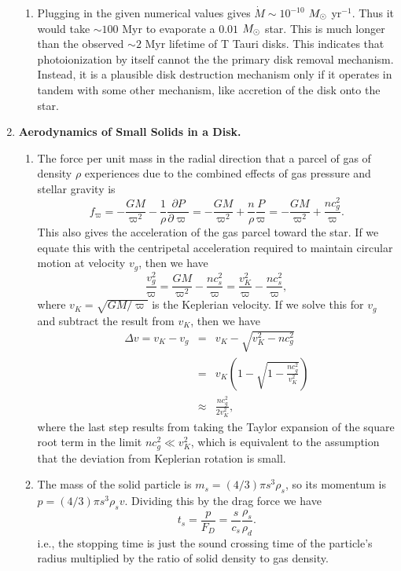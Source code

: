 \begin{enumerate}
\begin{enumerate}
\item Plugging in the given numerical values gives $\dot{M} \sim 10^{-10}$ $M_{\odot}$ yr$^{-1}$. Thus it would take $\sim 100$ Myr to evaporate a $0.01$ $M_{\odot}$ star. This is much longer than the observed $\sim 2$ Myr lifetime of T Tauri disks. This indicates that photoionization by itself cannot the the primary disk removal mechanism. Instead, it is a plausible disk destruction mechanism only if it operates in tandem with some other mechanism, like accretion of the disk onto the star.

\end{enumerate}

\item {\bf Aerodynamics of Small Solids in a Disk.}

\begin{enumerate}

\item The force per unit mass in the radial direction that a parcel of gas of density $\rho$ experiences due to the combined effects of gas pressure and stellar gravity is
\begin{displaymath}
f_\varpi = -\frac{G M}{\varpi^2} - \frac{1}{\rho}\frac{\partial P}{\partial \varpi} = -\frac{GM}{\varpi^2} + \frac{n}{\rho}\frac{P}{\varpi} = -\frac{GM}{\varpi^2} + \frac{n c_g^2}{\varpi}.
\end{displaymath}
This also gives the acceleration of the gas parcel toward the star. If we equate this with the centripetal acceleration required to maintain circular motion at velocity $v_g$, then we have
\begin{displaymath}
\frac{v_g^2}{\varpi} = \frac{GM}{\varpi^2} - \frac{n c_s^2}{\varpi} = \frac{v_K^2}{\varpi} - \frac{n c_s^2}{\varpi},
\end{displaymath}
where $v_K = \sqrt{GM/\varpi}$ is the Keplerian velocity. If we solve this for $v_g$ and subtract the result from $v_K$, then we have
\begin{eqnarray*}
\Delta v = v_K - v_g & = & v_K - \sqrt{v_K^2 - n c_g^2} \\
& = & v_K \left(1 - \sqrt{1 - \frac{n c_g^2}{v_K^2}}\right) \\
& \approx & \frac{n c_g^2}{2 v_K^2},
\end{eqnarray*}
where the last step results from taking the Taylor expansion of the square root term in the limit $nc_g^2 \ll v_K^2$, which is equivalent to the assumption that the deviation from Keplerian rotation is small.

\item The mass of the solid particle is $m_s = (4/3)\pi s^3 \rho_s$, so its momentum is $p = (4/3)\pi s^3 \rho_s v$. Dividing this by the drag force we have
\begin{displaymath}
t_s = \frac{p}{F_D} = \frac{s}{c_s}\frac{\rho_s}{\rho_d}.
\end{displaymath}
i.e., the stopping time is just the sound crossing time of the particle's radius multiplied by the ratio of solid density to gas density.


\end{enumerate}
\end{enumerate}
